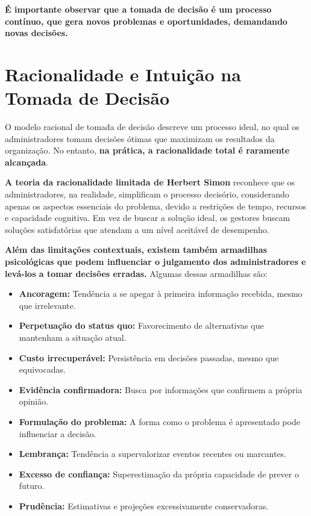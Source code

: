 \textbf{É importante observar que a tomada de decisão é um processo contínuo, que gera novos problemas e oportunidades, demandando novas decisões.}

\section{Racionalidade e Intuição na Tomada de Decisão}

O modelo racional de tomada de decisão descreve um processo ideal, no qual os administradores tomam decisões ótimas que maximizam os resultados da organização. No entanto, \textbf{na prática, a racionalidade total é raramente alcançada}.

\textbf{A teoria da racionalidade limitada de Herbert Simon} reconhece que os administradores, na realidade, simplificam o processo decisório, considerando apenas os aspectos essenciais do problema, devido a restrições de tempo, recursos e capacidade cognitiva. Em vez de buscar a solução ideal, os gestores buscam soluções satisfatórias que atendam a um nível aceitável de desempenho.

\textbf{Além das limitações contextuais, existem também armadilhas psicológicas que podem influenciar o julgamento dos administradores e levá-los a tomar decisões erradas.} Algumas dessas armadilhas são:

\begin{itemize}
    \item \textbf{Ancoragem:} Tendência a se apegar à primeira informação recebida, mesmo que irrelevante.
    \item \textbf{Perpetuação do status quo:} Favorecimento de alternativas que mantenham a situação atual.
    \item \textbf{Custo irrecuperável:} Persistência em decisões passadas, mesmo que equivocadas.
    \item \textbf{Evidência confirmadora:} Busca por informações que confirmem a própria opinião.
    \item \textbf{Formulação do problema:} A forma como o problema é apresentado pode influenciar a decisão.
    \item \textbf{Lembrança:} Tendência a supervalorizar eventos recentes ou marcantes.
    \item \textbf{Excesso de confiança:} Superestimação da própria capacidade de prever o futuro.
    \item \textbf{Prudência:} Estimativas e projeções excessivamente conservadoras.
\end{itemize}

